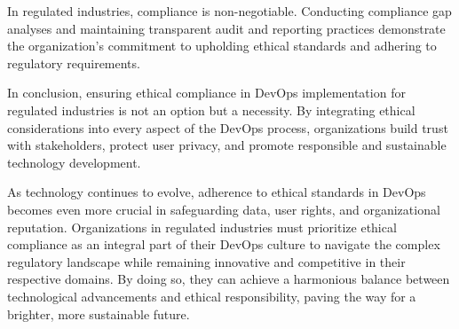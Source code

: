 \documentclass[conference]{IEEEtran}
\begin{document}
In regulated industries, compliance is non-negotiable. Conducting compliance gap analyses and maintaining transparent audit and reporting practices demonstrate the organization's commitment to upholding ethical standards and adhering to regulatory requirements.

In conclusion, ensuring ethical compliance in DevOps implementation for regulated industries is not an option but a necessity. By integrating ethical considerations into every aspect of the DevOps process, organizations build trust with stakeholders, protect user privacy, and promote responsible and sustainable technology development.

As technology continues to evolve, adherence to ethical standards in DevOps becomes even more crucial in safeguarding data, user rights, and organizational reputation. Organizations in regulated industries must prioritize ethical compliance as an integral part of their DevOps culture to navigate the complex regulatory landscape while remaining innovative and competitive in their respective domains. By doing so, they can achieve a harmonious balance between technological advancements and ethical responsibility, paving the way for a brighter, more sustainable future.
\end{document}
